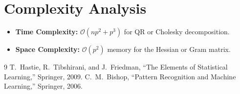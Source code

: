 \documentclass[11pt,a4paper]{article}
\theoremstyle{definition}
\begin{document}
\section{Complexity Analysis}
\begin{itemize}
    \item \textbf{Time Complexity:} $\mathcal{O}(n p^2 + p^3)$ for QR or Cholesky decomposition.
    \item \textbf{Space Complexity:} $\mathcal{O}(p^2)$ memory for the Hessian or Gram matrix.
\end{itemize}

\begin{thebibliography}{9}
 T.~Hastie, R.~Tibshirani, and J.~Friedman, ``The Elements of Statistical Learning,'' Springer, 2009.
 C.~M.~Bishop, ``Pattern Recognition and Machine Learning,'' Springer, 2006.
\end{thebibliography}
\end{document}
